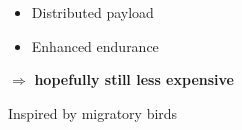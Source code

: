 \documentclass[12pt,svgnames,table,draft=false]{beamer}
\begin{document}
\begin{frame}{}

\vspace{-8em}
\centering
\begin{tcolorbox}[width=.8\textwidth,colback={gray!10!}]  
\centering
\begin{itemize}
\item Distributed payload
\item Enhanced endurance
\end{itemize}
\centering
$\Rightarrow$ \textbf{hopefully still less expensive}
\end{tcolorbox}  

\end{frame}

\begin{frame}{Inspired by migratory birds}

\end{frame}
\end{document}
